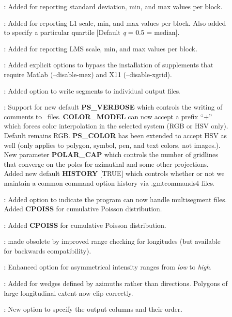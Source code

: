 \begin{description}
\item []: Added  for reporting standard deviation, min, and max values per block.
\item []: Added  for reporting L1 scale, min, and max values per block.
Also added  to specify a particular quartile [Default {\it q} = 0.5 = median].
\item []: Added  for reporting LMS scale, min, and max values per block.
\item []: Added explicit options to bypass the installation of supplements
that require Matlab (--disable-mex) and X11 (--disable-xgrid).
\item []: Added  option to write segments to individual output files.
\item []: Support for new default {\bf PS\_VERBOSE} which controls the
writing of comments to \PS\ files.  {\bf COLOR\_MODEL} can now accept a prefix ``+'' which
forces color interpolation in the selected system (RGB or HSV only).  Default remains RGB.
{\bf PS\_COLOR} has been extended to accept HSV as well (only applies to
polygon, symbol, pen, and text colors, not images.).  New parameter {\bf POLAR\_CAP} which
controls the number of gridlines that converge on the poles for azimuthal and some other projections.
Added new default {\bf HISTORY} [TRUE] which controls whether or not we maintain a common command option
history via .gmtcommands4 files.
\item []: Added option  to indicate the program can now handle multisegment files.
Added {\bf CPOISS} for cumulative Poisson distribution.
\item []: Added {\bf CPOISS} for cumulative Poisson distribution.
\item []:  made obsolete by improved range checking for longitudes (but available for
backwards compatibility).
\item []: Enhanced  option for asymmetrical intensity ranges from {\it low} to {\it high}.
\item []: Added  for wedges defined by azimuths rather than directions.  Polygons of large
longitudinal extent now clip correctly.
\item []: New option  to specify the output columns and their order.
\end{description}

